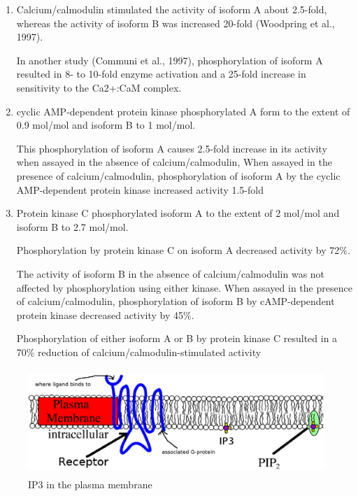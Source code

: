 \begin{enumerate}
  \item  Calcium/calmodulin stimulated the activity of isoform A about 2.5-fold, whereas
the activity of isoform B was increased 20-fold (Woodpring et al., 1997).

In another study (Communi et al., 1997), phosphorylation of isoform A resulted
in 8- to 10-fold enzyme activation and a 25-fold increase in sensitivity to the
Ca2+:CaM complex.

  \item cyclic AMP-dependent protein kinase phosphorylated A form to the extent
  of 0.9 mol/mol and isoform B to 1 mol/mol. 

This phosphorylation of isoform A causes 2.5-fold increase in its activity when
assayed in the absence of calcium/calmodulin, 
When assayed in the presence of calcium/calmodulin, phosphorylation of isoform A
by the cyclic AMP-dependent protein kinase increased activity 1.5-fold
  
  \item Protein kinase C phosphorylated isoform A to the extent of 2 mol/mol and
  isoform B to 2.7 mol/mol. 

Phosphorylation by protein kinase C on isoform A decreased activity by 72\%.

The activity of isoform B in the absence of calcium/calmodulin was not affected
by phosphorylation using either kinase.
When assayed in the presence of calcium/calmodulin, phosphorylation of isoform B
by cAMP-dependent protein kinase decreased activity by 45\%.


Phosphorylation of either isoform A or B by protein kinase C resulted in a 70\%
reduction of calcium/calmodulin-stimulated activity
\end{enumerate}




\begin{figure}[hbt]
 \centerline{\includegraphics[height=4cm]{./images/IP3.eps}}
\caption{IP3 in the plasma membrane}
\label{fig:IP3}
\end{figure}

